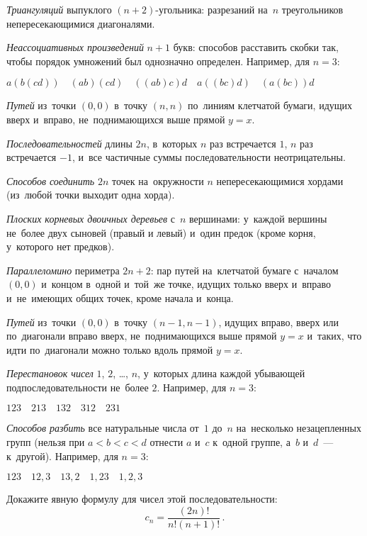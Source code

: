 \begin{problems}

\item
\emph{Триангуляций} выпуклого $(n + 2)$-угольника:
разрезаний на~$n$ треугольников непересекающимися диагоналями.

\item
\emph{Неассоциативных произведений} $n + 1$ букв:
способов расставить скобки так, чтобы порядок умножений был однозначно
определен.
Например, для $n = 3$:
\begin{center} \(
    a(b(cd)) \quad (ab)(cd) \quad ((ab)c)d \quad a((bc)d) \quad (a(bc))d
\) \end{center}

\item
\emph{Путей} из~точки $(0, 0)$ в~точку $(n, n)$ по~линиям клетчатой бумаги,
идущих вверх и~вправо, не~поднимающихся выше прямой $y = x$.

\item
\emph{Последовательностей} длины $2n$, в~которых $n$ раз встречается $1$,
$n$ раз встречается $-1$, и~все частичные суммы последовательности
неотрицательны.

\item
\emph{Способов соединить} $2 n$ точек на~окружности $n$ непересекающимися
хордами (из~любой точки выходит одна хорда).

\item
\emph{Плоских корневых двоичных деревьев} с~$n$ вершинами:
у~каждой вершины не~более двух сыновей (правый и левый) и~один предок
(кроме корня, у~которого нет предков).

\item
\emph{Параллеломино} периметра $2n+2$:
пар путей на~клетчатой бумаге с~началом $(0, 0)$ и~концом в~одной и~той~же
точке, идущих только вверх и~вправо и~не~имеющих общих точек, кроме начала
и~конца.

\item
\emph{Путей} из~точки $(0, 0)$ в~точку $(n - 1, n - 1)$, идущих
вправо, вверх или по~диагонали вправо вверх, не~поднимающихся выше
прямой $y = x$ и~таких, что идти по~диагонали можно только вдоль прямой
$y = x$.

\item
\emph{Перестановок чисел} $1$, $2$, \ldots, $n$, у~которых длина каждой
убывающей подпоследовательности не~более $2$.
Например, для $n = 3$:
\begin{center} \(
    123 \quad 213 \quad 132 \quad 312 \quad 231
\) \end{center}

\item
\emph{Способов разбить} все натуральные числа от~$1$ до~$n$ на~несколько
незацепленных групп (нельзя при $a < b < c < d$ отнести $a$ и~$c$ к~одной
группе, а~$b$ и~$d$~--- к~другой).
Например, для $n = 3$:
\begin{center} \(
    123 \quad 12,3 \quad 13,2 \quad 1,23 \quad 1,2,3
\) \end{center}

\item
Докажите явную формулу для чисел этой последовательности:
\[
    c_{n} = \frac{(2 n)!}{n! (n + 1)!}
\, . \]

\end{problems}

